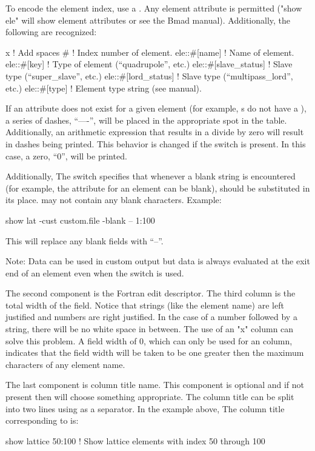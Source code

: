 {{{\begin{description}
To encode the element index, use a \vn{\#}.
Any element attribute is permitted ("show ele" will show element
attributes or see the Bmad manual). Additionally, the following are
recognized:
\begin{example}
  x                          ! Add spaces
  #                          ! Index number of element.
  ele::#[name]                ! Name of element.
  ele::#[key]                 ! Type of element (``quadrupole'', etc.)
  ele::#[slave_status]        ! Slave type (``super_slave'', etc.)
  ele::#[lord_status]         ! Slave type (``multipass_lord'', etc.)
  ele::#[type]                ! Element type string (see \bmad manual).
\end{example}
If an attribute does not exist for a given element (for example,
s do not have a ), a series of dashes,
``----'', will be placed in the appropriate spot in the table.
Additionally, an arithmetic expression that results in a divide by
zero will result in dashes being printed. This behavior is changed if
the  switch is present. In this case, a zero, ``0'', will
be printed. 

Additionally, The  switch specifies
that whenever a blank string is encountered (for example, the
 attribute for an element can be blank),  should
be substituted in its place.  may not contain any blank
characters. Example:
\begin{example}
  show lat -cust custom.file -blank -- 1:100
\end{example}
This will replace any blank fields with ``--''.

Note: Data can be used in custom output but data is always evaluated at
the exit end of an element even when the  switch is used.

The second component is the Fortran edit descriptor. The third column
is the total width of the field. Notice that strings (like the element
name) are left justified and numbers are right justified. In the case
of a number followed by a string, there will be no white space in
between. The use of an "x" column can solve this problem. A field
width of 0, which can only be used for an  column,
indicates that the field width will be taken to be one greater then
the maximum characters of any element name.

The last component is column title name. This component is optional
and if not present then \tao will choose something appropriate. The
column title can be split into two lines using  as a separator.
In the example above, The column title corresponding to  
is:
\begin{example}
  show lattice 50:100         ! Show lattice elements with index 50 through 100
\end{example}


\end{description}}}}
